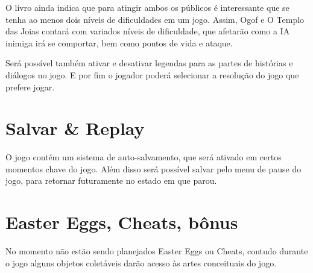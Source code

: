 O livro ainda indica que para atingir ambos os públicos é interessante que se tenha ao menos dois níveis de dificuldades em um jogo. Assim, Ogof e O Templo das Joias contará com variados níveis de dificuldade, que afetarão como a IA inimiga irá se comportar, bem como pontos de vida e ataque.

Será possível também ativar e desativar legendas para as partes de histórias e diálogos no jogo. E por fim o jogador poderá selecionar a resolução do jogo que prefere jogar.

\section{Salvar \& Replay}

O jogo contém um sistema de auto-salvamento, que será ativado em certos momentos chave do jogo. Além disso será possível salvar pelo menu de pause do jogo, para retornar futuramente no estado em que parou.

\section{Easter Eggs, Cheats, bônus}

No momento não estão sendo planejados Easter Eggs ou Cheats, contudo durante o jogo alguns objetos coletáveis darão acesso às artes conceituais do jogo.
